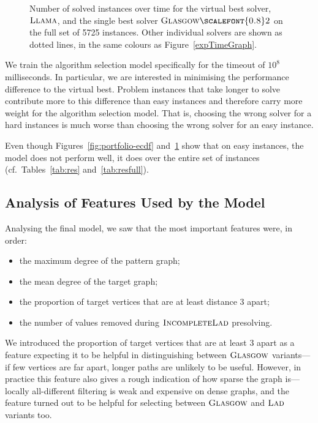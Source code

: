 \documentclass{llncs}
\newcommand{\Glasgow}{$\textsc{Glasgow}$\xspace}
\newcommand{\LAD}{$\textsc{Lad}$\xspace}
\newcommand{\IncompleteLAD}{$\textsc{IncompleteLad}$\xspace}
\newcommand{\GlasgowTwo}{$\textsc{Glasgow{\scalefont{0.8}2}}$\xspace}
\newcommand{\LLAMA}{$\textsc{Llama}$\xspace}
\begin{document}
\begin{figure}[p]
    
\caption{Number of solved instances over time for the virtual best solver,
\LLAMA, and the single best solver \GlasgowTwo on the full set of 5725
instances. Other individual solvers are shown as dotted lines, in the same
colours as Figure~\ref{expTimeGraph}. }
\label{fig:portfolio-ecdf-full}

\end{figure}

We train the algorithm selection model specifically for the timeout of $10^8$
milliseconds. In particular, we are interested in minimising the performance
difference to the virtual best. Problem instances that take longer to solve
contribute more to this difference than easy instances and therefore carry more
weight for the algorithm selection model. That is, choosing the wrong solver for
a hard instances is much worse than choosing the wrong solver for an easy
instance.

Even though Figures~\ref{fig:portfolio-ecdf} and~\ref{fig:portfolio-ecdf-full}
show that on easy instances, the model does not perform well, it does over
the entire set of instances (cf.\ Tables~\ref{tab:res} and~\ref{tab:resfull}).

\subsection{Analysis of Features Used by the Model}

Analysing the final model, we saw that the most important features were, in order:

\begin{itemize}
    \item the maximum degree of the pattern graph;
    \item the mean degree of the target graph;
    \item the proportion of target vertices that are at least distance 3
        apart;
    \item the number of values removed during \IncompleteLAD presolving.
\end{itemize}

\noindent
We introduced the proportion of target vertices that are at least 3 apart as a
feature expecting it to be helpful in distinguishing between
\Glasgow variants---if few vertices are far apart, longer paths are unlikely to
be useful. However, in practice this feature also gives a rough indication of
how sparse the graph is---locally all-different filtering is weak and expensive
on dense graphs, and the feature turned out to be helpful for selecting between
\Glasgow and \LAD variants too.
\end{document}

